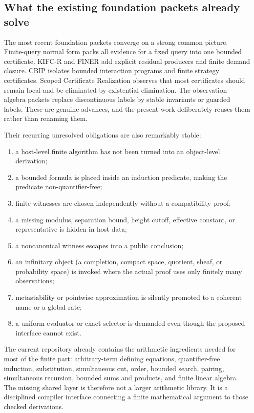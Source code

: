 \subsection{What the existing foundation packets already solve}

The most recent foundation packets converge on a strong common picture.
Finite-query normal form packs all evidence for a fixed query into one bounded
certificate.  KIFC-R and FINER add explicit residual producers and finite
demand closure.  CBIP isolates bounded interaction programs and finite
strategy certificates.  Scoped Certificate Realization observes that most
certificates should remain local and be eliminated by existential elimination.
The observation-algebra packets replace discontinuous labels by stable
invariants or guarded labels.  These are genuine advances, and the present
work deliberately reuses them rather than renaming them.

Their recurring unresolved obligations are also remarkably stable:

\begin{enumerate}
\item a host-level finite algorithm has not been turned into an object-level
      derivation;
\item a bounded formula is placed inside an induction predicate, making the
      predicate non-quantifier-free;
\item finite witnesses are chosen independently without a compatibility proof;
\item a missing modulus, separation bound, height cutoff, effective constant,
      or representative is hidden in host data;
\item a noncanonical witness escapes into a public conclusion;
\item an infinitary object (a completion, compact space, quotient, sheaf, or
      probability space) is invoked where the actual proof uses only finitely
      many observations;
\item metastability or pointwise approximation is silently promoted to a
      coherent name or a global rate;
\item a uniform evaluator or exact selector is demanded even though the
      proposed interface cannot exist.
\end{enumerate}

The current repository already contains the arithmetic ingredients needed for
most of the finite part: arbitrary-term defining equations, quantifier-free
induction, substitution, simultaneous cut, order, bounded search, pairing,
simultaneous recursion, bounded sums and products, and finite linear algebra.
The missing shared layer is therefore not a larger arithmetic library.  It is
a disciplined compiler interface connecting a finite mathematical argument to
those checked derivations.

